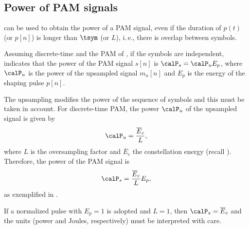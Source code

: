 
\subsection{Power of PAM signals}
\label{sec:powerPAMSignal}

 can be used to obtain the power of a PAM signal, even if the duration of $p(t)$ (or $p[n]$) is longer than $\tsym$ (or $L$), i.\,e., there is overlap between symbols.

Assuming discrete-time and the PAM of , 
if the symbols are independent,  indicates that the power of the PAM signal $s[n]$ is $\calP_s = \calP_u E_p$, 
where $\calP_u$ is the power of the upsampled signal $m_u[n]$ and $E_p$ is the energy of the shaping pulse $p[n]$.

The upsampling modifies the power of the sequence of symbols and this must be taken in account.
For discrete-time PAM, the power $\calP_u$ of the upsampled signal is given by
\begin{equation}
\calP_u = \frac{\overline E_c}{L},
\label{eq:powerUpsampledSignal}
\end{equation}
where $L$ is the oversampling factor and $\overline E_c$ the constellation energy (recall ).
Therefore, the power of the PAM signal is
\begin{equation}
\calP_s = \frac{\overline E_c}{L} E_p,
\label{eq:pamPowerDiscreteTime}
\end{equation}
as exemplified in . 

If a normalized pulse with $E_p=1$ is adopted and $L=1$, then $\calP_s = \overline E_c$ and the units (power and Joules, respectively) must be interpreted with care.



